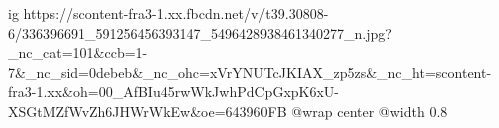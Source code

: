  
 
 
 
 

\ifcmt
  ig https://scontent-fra3-1.xx.fbcdn.net/v/t39.30808-6/336396691_591256456393147_5496428938461340277_n.jpg?_nc_cat=101&ccb=1-7&_nc_sid=0debeb&_nc_ohc=xVrYNUTcJKIAX_zp5zs&_nc_ht=scontent-fra3-1.xx&oh=00_AfBIu45rwWkJwhPdCpGxpK6xU-XSGtMZfWvZh6JHWrWkEw&oe=643960FB
  @wrap center
  @width 0.8
\fi
